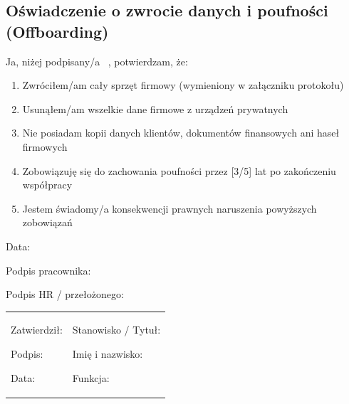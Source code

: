 \documentclass[12pt,a4paper]{article}
\providecommand{\tightlist}{\setlength{\itemsep}{0pt}\setlength{\parskip}{0pt}}
\begin{document}
\subsection{Oświadczenie o zwrocie danych i poufności
(Offboarding)}\label{oux15bwiadczenie-o-zwrocie-danych-i-poufnoux15bci-offboarding}

Ja, niżej podpisany/a {~}, potwierdzam, że:

\begin{enumerate}
\tightlist
\item
  Zwróciłem/am cały sprzęt firmowy (wymieniony w załączniku protokołu)
\item
  Usunąłem/am wszelkie dane firmowe z urządzeń prywatnych
\item
  Nie posiadam kopii danych klientów, dokumentów finansowych ani haseł
  firmowych
\item
  Zobowiązuję się do zachowania poufności przez {[}3/5{]} lat po
  zakończeniu współpracy
\item
  Jestem świadomy/a konsekwencji prawnych naruszenia powyższych
  zobowiązań
\end{enumerate}

Data: \underline{\hspace{3cm}}

Podpis pracownika: \underline{\hspace{3cm}}

Podpis HR / przełożonego: \underline{\hspace{3cm}}

\begin{longtable}[]{@{}
  >{\raggedright\arraybackslash}p{}
  >{\raggedright\arraybackslash}p{}@{}}
\toprule\noalign{}
\endhead
\bottomrule\noalign{}
\endlastfoot
\begin{minipage}[t]{\linewidth}\raggedright
Zatwierdził:

Podpis: \underline{\hspace{3cm}}

Data: \underline{\hspace{4cm}}
\end{minipage} & \begin{minipage}[t]{\linewidth}\raggedright
Stanowisko / Tytuł:

Imię i nazwisko: \underline{\hspace{3cm}}

Funkcja: \underline{\hspace{3cm}}
\end{minipage} \\
\end{longtable}
\end{document}
